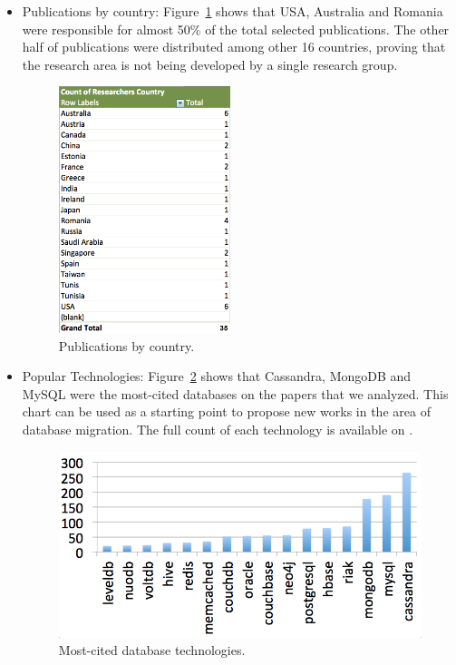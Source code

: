 \documentclass[conference, 10pt, a4paper]{IEEEtran}
\begin{document}
\begin{itemize}
\item{Publications by country: }
Figure~\ref{fig:pubVsCountry} shows that USA, Australia and Romania were responsible for almost 50\% of the total selected publications. The other half of publications were distributed among other 16 countries, proving that the research area is not being developed by a single research group. 
\begin{figure}[htb!]
\centering
\includegraphics[width=50mm]{graph3.png}
\caption{Publications by country. \label{fig:pubVsCountry}}
\end{figure}



\item{Popular Technologies: }
Figure~\ref{fig:mostCitedDB} shows that Cassandra, MongoDB and MySQL were the most-cited databases on the papers that we analyzed. This chart can be used as a starting point to propose new works in the area of database migration. The full count of each technology is available on \cite{fullDBJson}.
\begin{figure}%
\centering
\includegraphics[width=120mm]{db-graph.png}
\caption{Most-cited database technologies. \label{fig:mostCitedDB}}
\end{figure}


\end{itemize}
\end{document}
